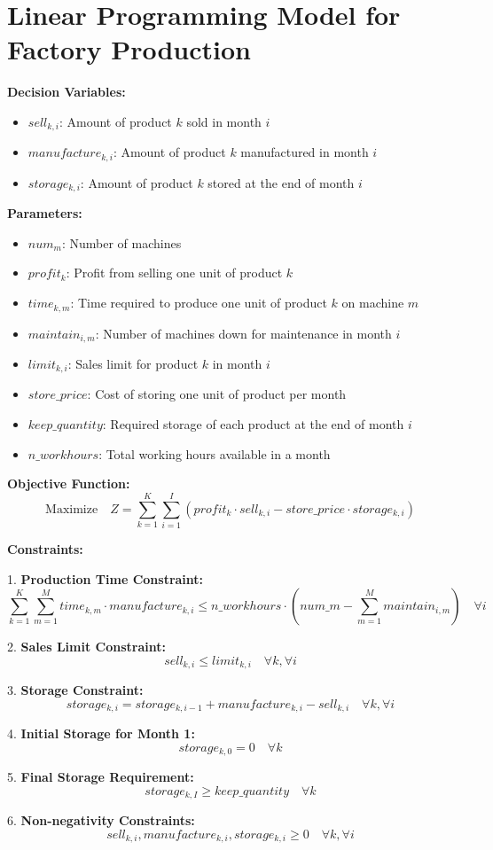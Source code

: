 \documentclass{article}
\begin{document}
\section*{Linear Programming Model for Factory Production}

\textbf{Decision Variables:}
\begin{itemize}
    \item \( sell_{k,i} \): Amount of product \( k \) sold in month \( i \)
    \item \( manufacture_{k,i} \): Amount of product \( k \) manufactured in month \( i \)
    \item \( storage_{k,i} \): Amount of product \( k \) stored at the end of month \( i \)
\end{itemize}

\textbf{Parameters:}
\begin{itemize}
    \item \( num_m \): Number of machines
    \item \( profit_k \): Profit from selling one unit of product \( k \)
    \item \( time_{k,m} \): Time required to produce one unit of product \( k \) on machine \( m \)
    \item \( maintain_{i,m} \): Number of machines down for maintenance in month \( i \)
    \item \( limit_{k,i} \): Sales limit for product \( k \) in month \( i \)
    \item \( store\_price \): Cost of storing one unit of product per month
    \item \( keep\_quantity \): Required storage of each product at the end of month \( i \)
    \item \( n\_workhours \): Total working hours available in a month
\end{itemize}

\textbf{Objective Function:}
\[
\text{Maximize} \quad Z = \sum_{k=1}^{K} \sum_{i=1}^{I} \left( profit_k \cdot sell_{k,i} - store\_price \cdot storage_{k,i} \right)
\]

\textbf{Constraints:}

1. \textbf{Production Time Constraint:}
\[
\sum_{k=1}^{K} \sum_{m=1}^{M} time_{k,m} \cdot manufacture_{k,i} \leq n\_workhours \cdot (num\_m - \sum_{m=1}^{M} maintain_{i,m}) \quad \forall i
\]

2. \textbf{Sales Limit Constraint:}
\[
sell_{k,i} \leq limit_{k,i} \quad \forall k, \forall i
\]

3. \textbf{Storage Constraint:}
\[
storage_{k,i} = storage_{k,i-1} + manufacture_{k,i} - sell_{k,i} \quad \forall k, \forall i
\]

4. \textbf{Initial Storage for Month 1:}
\[
storage_{k,0} = 0 \quad \forall k
\]

5. \textbf{Final Storage Requirement:}
\[
storage_{k,I} \geq keep\_quantity \quad \forall k
\]

6. \textbf{Non-negativity Constraints:}
\[
sell_{k,i}, manufacture_{k,i}, storage_{k,i} \geq 0 \quad \forall k, \forall i
\]
\end{document}
